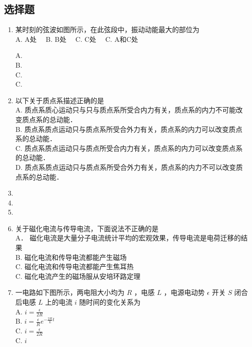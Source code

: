 
\subsection{选择题}
\begin{enumerate}
\item 某时刻的弦波如图所示，在此弦段中，振动动能最大的部位为\\
A. A处$\quad$
B. B处$\quad$
C. C处$\quad$
C. A和C处$\quad$


A. \\
B. \\
C. \\
C. \\

\item 以下关于质点系描述正确的是\\
A. 质点系质心运动只与只与质点系所受合内力有关，质点系的内力不可能改变质点系的总动能．\\
B. 质点系质点运动只与质点系所受合外力有关，质点系的内力可以改变质点系的总动能．\\
C. 质点系质点运动只与质点所受合内力有关，质点系的内力可以改变质点系的总动能．\\
D. 质点系质点运动只与质点系所受合外力有关，质点系的内力不可以改变质点系的总动能．\\
\item 
\item 
\item 
\item 关于磁化电流与传导电流，下面说法不正确的是\\
A． 磁化电流是大量分子电流统计平均的宏观效果，传导电流是电荷迁移的结果\\
B. 磁化电流和传导电流都能产生磁场\\
C. 磁化电流和传导电流都能产生焦耳热\\
C. 磁化电流产生的磁场服从安培环路定理\\
\item 一电路如下图所示，两电阻大小均为 $R$ ，电感 $L$ ，电源电动势 $\epsilon$ 开关 $S$ 闭合后电感 $L$ 上的电流 $i$ 随时间的变化关系为\\
A. $i = \frac{\epsilon}{2R}$\\
B. $i = \frac{\epsilon}{R}e^{-\frac{2R}{L}t}$\\
C. $i = \frac{\epsilon}{2R}$\\
C. $i$\\
\end{enumerate}